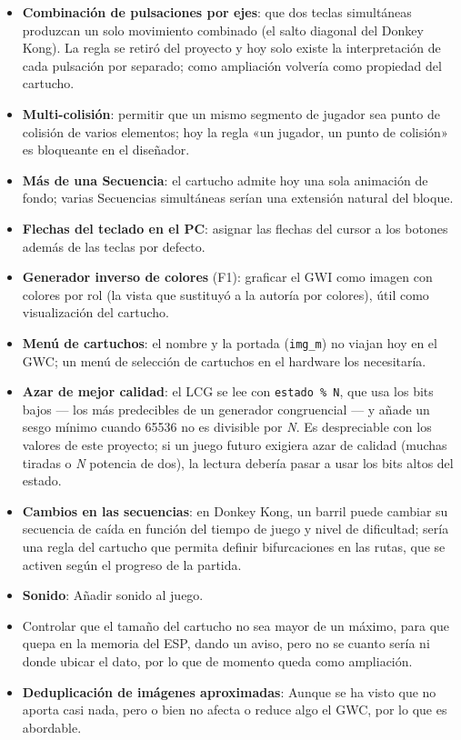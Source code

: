 \begin{itemize}
	\item \textbf{Combinación de pulsaciones por ejes}: que dos
	teclas simultáneas produzcan un solo movimiento combinado (el salto
	diagonal del Donkey Kong). La regla se retiró del proyecto y hoy solo
	existe la interpretación de cada pulsación por separado; como
	ampliación volvería como propiedad del cartucho.

	\item \textbf{Multi-colisión}: permitir que un mismo segmento
	de jugador sea punto de colisión de varios elementos; hoy la regla
	«un jugador, un punto de colisión» es bloqueante en el diseñador.

	\item \textbf{Más de una Secuencia}: el cartucho admite hoy una
	sola animación de fondo; varias Secuencias simultáneas serían una
	extensión natural del bloque.

	\item \textbf{Flechas del teclado en el PC}: asignar las flechas del
	cursor a los botones además de las teclas por defecto.

	\item \textbf{Generador inverso de colores} (F1): graficar el GWI
	como imagen con colores por rol (la vista que sustituyó a la autoría
	por colores), útil como visualización del cartucho.

	\item \textbf{Menú de cartuchos}: el nombre y la portada
	(\texttt{img\_m}) no viajan hoy en el GWC; un menú de selección de
	cartuchos en el hardware los necesitaría.

	\item \textbf{Azar de mejor calidad}: el LCG se lee con
	\texttt{estado \% N}, que usa los bits bajos — los más predecibles
	de un generador congruencial — y añade un sesgo mínimo cuando
	65536 no es divisible por \emph{N}. Es despreciable con los valores
	de este proyecto; si un juego futuro exigiera azar de calidad
	(muchas tiradas o \emph{N} potencia de dos), la lectura debería pasar a
	usar los bits altos del estado.
	
	\item \textbf{Cambios en las secuencias}: en Donkey Kong, un
	barril puede cambiar su secuencia de caída en función del tiempo de
	juego y nivel de dificultad; sería una regla del cartucho que permita definir
	bifurcaciones en las rutas, que se activen según el progreso de la partida.
	
	\item \textbf{Sonido}: Añadir sonido al juego.
	
	\item Controlar que el tamaño del cartucho no sea mayor de un máximo, para que quepa en la memoria del ESP, dando un aviso, pero no se cuanto sería ni donde ubicar el dato, por lo que de momento queda como ampliación.
	
	\item \textbf{Deduplicación de imágenes aproximadas}: Aunque se ha visto que no aporta casi nada, pero o bien no afecta o reduce algo el GWC, por lo que es abordable.
\end{itemize}

